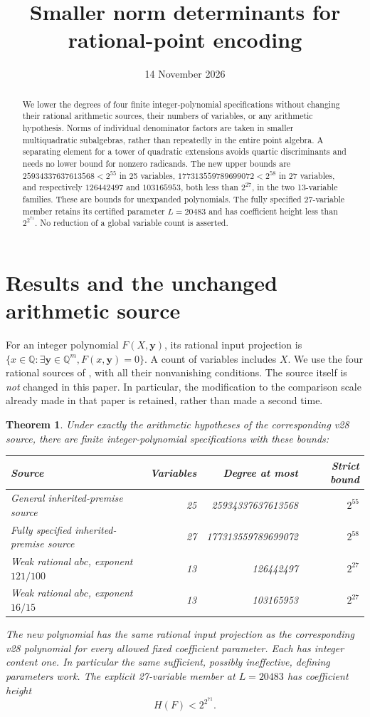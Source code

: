\documentclass[11pt,a4paper]{article}
\title{Smaller norm determinants for rational-point encoding}
\author{}\date{14 November 2026}
\newtheorem{theorem}{Theorem}[section]
\theoremstyle{remark}\newtheorem{remark}[theorem]{Remark}
\newcommand{\Q}{\mathbb Q}\newcommand{\Z}{\mathbb Z}\newcommand{\F}{\mathbb F}\newcommand{\C}{\mathbb C}
\begin{document}
\maketitle
\begin{abstract}
We lower the degrees of four finite integer-polynomial specifications without
changing their rational arithmetic sources, their numbers of variables, or
any arithmetic hypothesis. Norms of individual denominator factors are taken
in smaller multiquadratic subalgebras, rather than repeatedly in the entire
point algebra. A separating element for a tower of quadratic extensions
avoids quartic discriminants and needs no lower bound for nonzero radicands.
The new upper bounds are $25934337637613568<2^{55}$ in 25 variables,
$177313559789699072<2^{58}$ in 27 variables, and respectively
$126442497$ and $103165953$, both less than $2^{27}$, in the two
13-variable families. These are bounds for unexpanded polynomials.
The fully specified 27-variable member retains its certified parameter
$L=20483$ and has coefficient height less than $2^{2^{71}}$.
No reduction of a global variable count is asserted.
\end{abstract}

\section{Results and the unchanged arithmetic source}
For an integer polynomial $F(X,\boldsymbol y)$, its rational input projection
is $\{x\in\Q:\exists\boldsymbol y\in\Q^m,
F(x,\boldsymbol y)=0\}$. A count of variables includes $X$.
We use the four rational sources of \cite{UnitNorm}, with all their
nonvanishing conditions. The source itself is \emph{not} changed in this
paper. In particular, the modification to the comparison scale already
made in that paper is retained, rather than made a second time.

\begin{theorem}\label{thm:main}
Under exactly the arithmetic hypotheses of the corresponding v28 source,
there are finite integer-polynomial specifications with these bounds:
\begin{center}\small
\begin{tabular}{lrrr}\toprule
Source & Variables & Degree at most & Strict bound\\\midrule
General inherited-premise source &25&25934337637613568&$2^{55}$\\
Fully specified inherited-premise source&27&177313559789699072&$2^{58}$\\
Weak rational $abc$, exponent $121/100$&13&126442497&$2^{27}$\\
Weak rational $abc$, exponent $16/15$&13&103165953&$2^{27}$\\\bottomrule
\end{tabular}\end{center}
The new polynomial has the same rational input projection as the
corresponding v28 polynomial for every allowed fixed coefficient parameter.
Each has integer content one. In particular the same sufficient, possibly
ineffective, defining parameters work. The explicit 27-variable member at
$L=20483$ has coefficient height
\[
                              H(F)<2^{2^{71}}.
\]
\end{theorem}
\end{document}
